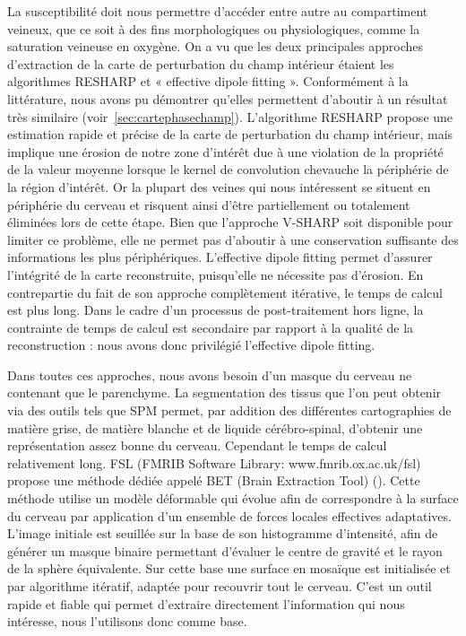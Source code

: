 {La susceptibilité doit nous permettre d’accéder entre autre au compartiment veineux, que ce
soit à des fins morphologiques ou physiologiques, comme la saturation veineuse en oxygène. On a vu
que les deux principales approches d’extraction de la carte de perturbation du champ intérieur étaient
les algorithmes RESHARP et « effective dipole fitting ». Conformément à la littérature, nous avons pu
démontrer qu’elles permettent d’aboutir à un résultat très similaire (voir~\ref{sec:cartephasechamp}). L’algorithme RESHARP
propose une estimation rapide et précise de la carte de perturbation du champ intérieur, mais implique
une érosion de notre zone d’intérêt due à une violation de la propriété de la valeur moyenne lorsque le kernel de convolution chevauche la périphérie de la région d’intérêt. Or la plupart des veines qui
nous intéressent se situent en périphérie du cerveau et risquent ainsi d’être partiellement ou
totalement éliminées lors de cette étape. Bien que l’approche V-SHARP soit disponible pour limiter ce
problème, elle ne permet pas d’aboutir à une conservation suffisante des informations les plus
périphériques. L’effective dipole fitting permet d’assurer l’intégrité de la carte reconstruite, puisqu’elle
ne nécessite pas d’érosion. En contrepartie du fait de son approche complètement itérative, le temps
de calcul est plus long. Dans le cadre d’un processus de post-traitement hors ligne, la contrainte de
temps de calcul est secondaire par rapport à la qualité de la reconstruction : nous avons donc privilégié
l’effective dipole fitting.

Dans toutes ces approches, nous avons besoin d’un masque du cerveau ne contenant que le
parenchyme. La segmentation des tissus que l’on peut obtenir via des outils tels que SPM permet, par
addition des différentes cartographies de matière grise, de matière blanche et de liquide cérébro-spinal, d’obtenir une représentation assez bonne du cerveau. Cependant le temps de calcul
relativement long. FSL (FMRIB Software Library: www.fmrib.ox.ac.uk/fsl) propose une méthode dédiée
appelé BET (Brain Extraction Tool) (\cite{Smith2002}). Cette méthode utilise un modèle déformable qui évolue afin
de correspondre à la surface du cerveau par application d’un ensemble de forces locales effectives
adaptatives. L’image initiale est seuillée sur la base de son histogramme d’intensité, afin de générer
un masque binaire permettant d’évaluer le centre de gravité et le rayon de la sphère équivalente. Sur
cette base une surface en mosaïque est initialisée et par algorithme itératif, adaptée pour recouvrir
tout le cerveau. C’est un outil rapide et fiable qui permet d’extraire directement l’information qui nous
intéresse, nous l’utilisons donc comme base.

}
